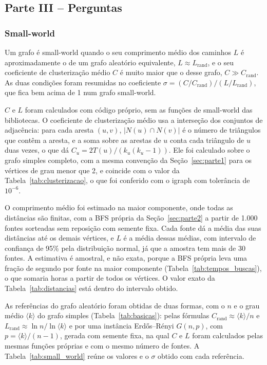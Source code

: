 \subsection{Parte III -- Perguntas}
\label{sec:parte3}

\subsubsection{Small-world}

Um grafo é small-world quando o seu comprimento médio dos caminhos $L$ é aproximadamente o de um grafo aleatório equivalente, $L \approx L_{\mathrm{rand}}$, e o seu coeficiente de clusterização médio $C$ é muito maior que o desse grafo, $C \gg C_{\mathrm{rand}}$. As duas condições foram resumidas no coeficiente $\sigma = (C/C_{\mathrm{rand}})/(L/L_{\mathrm{rand}})$, que fica bem acima de 1 num grafo small-world.

$C$ e $L$ foram calculados com código próprio, sem as funções de small-world das bibliotecas. O coeficiente de clusterização médio usa a interseção dos conjuntos de adjacência: para cada aresta $(u, v)$, $|N(u) \cap N(v)|$ é o número de triângulos que contêm a aresta, e a soma sobre as arestas de $u$ conta cada triângulo de $u$ duas vezes, o que dá $C_u = 2T(u)/(k_u(k_u-1))$. Ele foi calculado sobre o grafo simples completo, com a mesma convenção da Seção~\ref{sec:parte1} para os vértices de grau menor que 2, e coincide com o valor da Tabela~\ref{tab:clusterizacao}, o que foi conferido com o igraph com tolerância de $10^{-6}$.

O comprimento médio foi estimado na maior componente, onde todas as distâncias são finitas, com a BFS própria da Seção~\ref{sec:parte2} a partir de 1.000 fontes sorteadas sem reposição com semente fixa. Cada fonte dá a média das suas distâncias até os demais vértices, e $L$ é a média dessas médias, com intervalo de confiança de 95\% pela distribuição normal, já que a amostra tem mais de 30 fontes. A estimativa é amostral, e não exata, porque a BFS própria leva uma fração de segundo por fonte na maior componente (Tabela~\ref{tab:tempos_buscas}), o que somaria horas a partir de todos os vértices. O valor exato da Tabela~\ref{tab:distancias} está dentro do intervalo obtido.

As referências do grafo aleatório foram obtidas de duas formas, com o $n$ e o grau médio $\langle k \rangle$ do grafo simples (Tabela~\ref{tab:basicas}): pelas fórmulas $C_{\mathrm{rand}} \approx \langle k \rangle/n$ e $L_{\mathrm{rand}} \approx \ln n/\ln \langle k \rangle$ e por uma instância Erdős--Rényi $G(n, p)$, com $p = \langle k \rangle/(n-1)$, gerada com semente fixa, na qual $C$ e $L$ foram calculados pelas mesmas funções próprias e com o mesmo número de fontes. A Tabela~\ref{tab:small_world} reúne os valores e o $\sigma$ obtido com cada referência.

